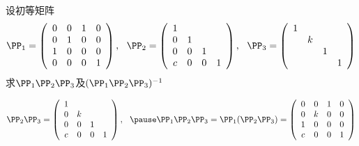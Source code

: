 \begin{frame}\ft{\secname}

\begin{li} 
  设初等矩阵
  $$
  \begin{aligned}
  \PP_1 = \left(
    \begin{array}{cccc}
      0&0&1&0 \\
      0&1&0&0 \\
      1&0&0&0 \\
      0&0&0&1
    \end{array}
  \right), ~~
  \PP_2 = \left(
    \begin{array}{cccc}
      1& & &  \\
      0&1& &  \\
      0&0&1& \\
      c&0&0&1
    \end{array}
  \right), ~~
  \PP_3 = \left(
    \begin{array}{cccc}
      1& & &  \\
       &k& &  \\
       & &1& \\
       & & &1
    \end{array}
  \right)
  \end{aligned}
  $$
  求$\PP_1\PP_2\PP_3$及$(\PP_1\PP_2\PP_3)^{-1}$
\end{li}

\end{frame}


\begin{frame}\ft{\secname}

\begin{jie}
$$
\begin{aligned}
\PP_2\PP_3 =    \left(
\begin{array}{cccc}
1& & &  \\
0&k& &  \\
0&0&1& \\
c&0&0&1
\end{array}
\right), ~~\pause
\PP_1\PP_2\PP_3=\PP_1(\PP_2\PP_3) =\left(
\begin{array}{cccc}
0&0&1&0 \\
0&k&0&0  \\
1&0&0&0  \\
c&0&0&1
\end{array}
\right)
\end{aligned}
$$
\end{jie}

\end{frame}


